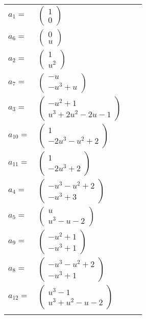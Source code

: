 \documentclass[1p]{elsarticle_modified}
\theoremstyle{definition}
\begin{document}
\begin{tabular}{m{7pt} m{180pt} m{7pt} m{180pt} }
\flushright $a_{1}=$&$\begin{pmatrix}1\\0\end{pmatrix}$ \\
\flushright $a_{6}=$&$\begin{pmatrix}0\\u\end{pmatrix}$ \\
\flushright $a_{2}=$&$\begin{pmatrix}1\\u^2\end{pmatrix}$ \\
\flushright $a_{7}=$&$\begin{pmatrix}- u\\- u^3+u\end{pmatrix}$ \\
\flushright $a_{3}=$&$\begin{pmatrix}- u^2+1\\u^3+2 u^2-2 u-1\end{pmatrix}$ \\
\flushright $a_{10}=$&$\begin{pmatrix}1\\-2 u^3- u^2+2\end{pmatrix}$ \\
\flushright $a_{11}=$&$\begin{pmatrix}1\\-2 u^3+2\end{pmatrix}$ \\
\flushright $a_{4}=$&$\begin{pmatrix}- u^3- u^2+2\\- u^3+3\end{pmatrix}$ \\
\flushright $a_{5}=$&$\begin{pmatrix}u\\u^3- u-2\end{pmatrix}$ \\
\flushright $a_{9}=$&$\begin{pmatrix}- u^2+1\\- u^3+1\end{pmatrix}$ \\
\flushright $a_{8}=$&$\begin{pmatrix}- u^3- u^2+2\\- u^3+1\end{pmatrix}$ \\
\flushright $a_{12}=$&$\begin{pmatrix}u^3-1\\u^3+u^2- u-2\end{pmatrix}$\\&\end{tabular}
\end{document}
